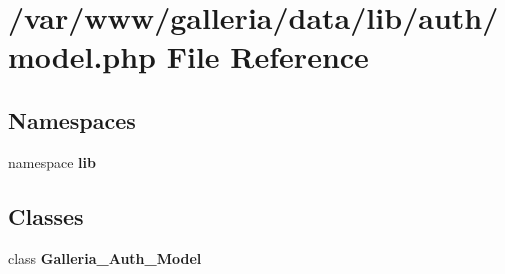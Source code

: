 \section{/var/www/galleria/data/lib/auth/model.php File Reference}
\label{auth_2model_8php}
\subsection*{Namespaces}
\begin{CompactItemize}
\item 
namespace {\bf lib}
\end{CompactItemize}
\subsection*{Classes}
\begin{CompactItemize}
\item 
class {\bf Galleria\_\-Auth\_\-Model}
\end{CompactItemize}
